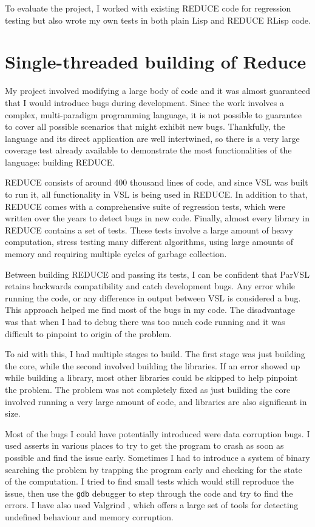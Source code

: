 To evaluate the project, I worked with existing REDUCE code for regression testing
but also wrote my own tests in both plain Lisp and REDUCE RLisp code.

\section{Single-threaded building of Reduce}

My project involved modifying a large body of code and it was almost guaranteed
that I would introduce bugs during development. Since the work involves a complex,
multi-paradigm programming language, it is not possible to guarantee to cover all
possible scenarios that might exhibit new bugs. Thankfully, the language and its
direct application are well intertwined, so there is a very large coverage test already
available to demonstrate the most functionalities of the language: building REDUCE.

REDUCE consists of around 400 thousand lines of code, and since VSL was built to
run it, all functionality in VSL is being used in REDUCE. In addition to that,
REDUCE comes with a comprehensive suite of regression tests, which were written over the
years to detect bugs in new code. Finally, almost every library in REDUCE contains a
set of tests. These tests involve a large amount of heavy computation, stress testing
many different algorithms, using large amounts of memory and requiring multiple cycles
of garbage collection.

Between building REDUCE and passing its tests, I can be confident that ParVSL retains
backwards compatibility and catch development bugs. Any error while running the code,
or any difference in output between VSL is considered a bug. This approach helped me
find most of the bugs in my code. The disadvantage was that when I had to debug there
was too much code running and it was difficult to pinpoint to origin of the problem.

To aid with this, I had multiple stages to build. The first stage was just building
the core, while the second involved building the libraries. If an error showed up while
building a library, most other libraries could be skipped to help pinpoint the problem.
The problem was not completely fixed as just building the core involved running
a very large amount of code, and libraries are also significant in size.

Most of the bugs I could have potentially introduced were data corruption bugs.
I used asserts in various places to try to get the program to crash as soon as possible
and find the issue early. Sometimes I had to introduce a system of binary searching the
problem by trapping the program early and checking for the state of the computation.
I tried to find small tests which would still reproduce the issue, then use the
\texttt{gdb} \cite{gdb} debugger to step through the code and try to find the errors. I have also used
Valgrind \cite{valgrind}, which offers a large set of tools for detecting undefined behaviour and memory
corruption.

